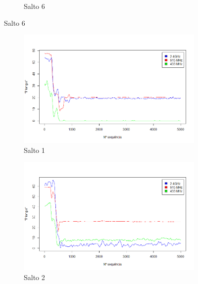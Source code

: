 \documentclass[
	12pt,				%
	openright,			%
	oneside,
	a4paper,			%
	english,			%
	french,				%
	spanish,			%
	brazil				%
	]{abntex2}
\begin{document}
\begin{figure}[htb]
\begin{subfigure}{.5\textwidth}
		\captionsetup{width=.9\textwidth}
		\caption{Salto 6}
		\label{dpr_no_opt_s6}
	\end{subfigure}
\end{figure}

\begin{figure}[htb]
	\centering
	\caption{Métrica \textit{Triangle})}
	\label{fig_trng_no_opt}
	\begin{subfigure}{.5\textwidth}
		\centering
		\includegraphics[width=.98\linewidth]{TRNG_Salto1}
		\captionsetup{width=.9\textwidth}
		\caption{Salto 1}
		\label{trng_no_opt_s1}
	\end{subfigure}%
	\begin{subfigure}{.5\textwidth}
		\centering
		\includegraphics[width=.98\linewidth]{TRNG_Salto2}
		\captionsetup{width=.9\textwidth}
		\caption{Salto 2}
		\label{trng_no_opt_s2}
	\end{subfigure}
	\begin{subfigure}{.5\textwidth}

\end{subfigure}
\end{figure}
\end{document}
